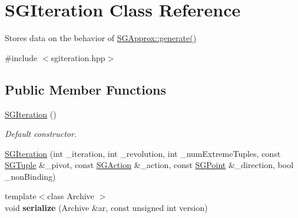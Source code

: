\hypertarget{classSGIteration}{\section{S\-G\-Iteration Class Reference}
\label{classSGIteration}
}


Stores data on the behavior of \hyperlink{classSGApprox_ac32645eb1ff336044f7ee5d523c610ce}{S\-G\-Approx\-::generate()}  




{\ttfamily \#include $<$sgiteration.\-hpp$>$}

\subsection*{Public Member Functions}
\begin{DoxyCompactItemize}
\item 
\hypertarget{classSGIteration_aa47645b3a728b2ca55ad2e7d17c5c488}{\hyperlink{classSGIteration_aa47645b3a728b2ca55ad2e7d17c5c488}{S\-G\-Iteration} ()}\label{classSGIteration_aa47645b3a728b2ca55ad2e7d17c5c488}

\begin{DoxyCompactList}\small\item\em Default constructor. \end{DoxyCompactList}\item 
\hyperlink{classSGIteration_a6c8811a084f0bfa216219b2bce504a45}{S\-G\-Iteration} (int \-\_\-iteration, int \-\_\-revolution, int \-\_\-num\-Extreme\-Tuples, const \hyperlink{classSGTuple}{S\-G\-Tuple} \&\-\_\-pivot, const \hyperlink{classSGAction}{S\-G\-Action} \&\-\_\-action, const \hyperlink{classSGPoint}{S\-G\-Point} \&\-\_\-direction, bool \-\_\-non\-Binding)
\item 
\hypertarget{classSGIteration_a19860e6d2af702df4ce47e36d4d43ec5}{{\footnotesize template$<$class Archive $>$ }\\void {\bfseries serialize} (Archive \&ar, const unsigned int version)}\label{classSGIteration_a19860e6d2af702df4ce47e36d4d43ec5}

\end{DoxyCompactItemize}
